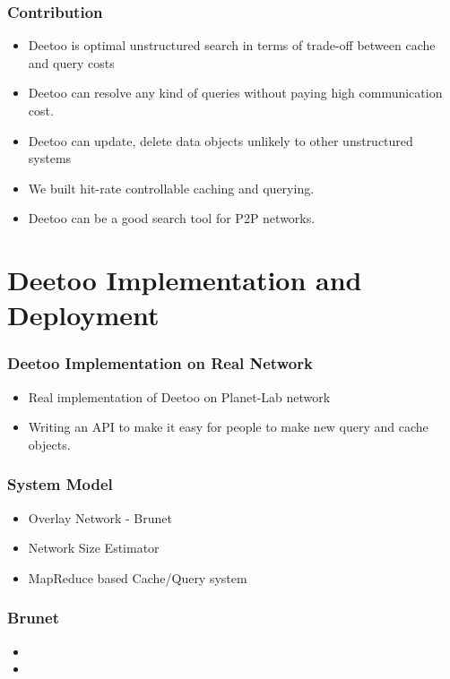 \documentclass[red]{beamer}
\begin{document}
\begin{frame}
\frametitle{Contribution}

\begin{itemize}
\item
Deetoo is optimal unstructured search in terms of trade-off between cache and query costs  
\item
Deetoo can resolve any kind of queries without paying high communication cost.
\item Deetoo can update, delete data objects unlikely to other unstructured systems
\item
We built hit-rate controllable caching and querying.
\item
Deetoo can be a good search tool for P2P networks.
\end{itemize}
\end{frame}

\section{Deetoo Implementation and Deployment}
\begin{frame}
\frametitle{Deetoo Implementation on Real Network}
\begin{itemize}
\item Real implementation of Deetoo on Planet-Lab network
\item Writing an API to make it easy for people to make new query and cache objects.
\end{itemize}
\end{frame}

\begin{frame}
\frametitle{System Model}
\begin{itemize}
\item Overlay Network - Brunet
\item Network Size Estimator
\item MapReduce based Cache/Query system
\end{itemize}
\end{frame}

\begin{frame}
\frametitle{Brunet}
\begin{itemize}
\item 
\item 
\end{itemize}
\end{frame}
\end{document}
